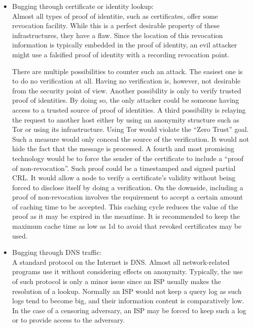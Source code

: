 \begin{itemize}
	\item Bugging through certificate or identity lookup:\\
	Almost all types of proof of identitie, such as certificates, offer some revocation facility. While this is a perfect desirable property of these infrastructures, they have a flaw. Since the location of this revocation information is typically embedded in the proof of identity, an evil attacker might use a falsified proof of identity with a recording revocation point.
	
	There are multiple possibilities to counter such an attack. The easiest one is to do no verification at all. Having no verification is, however, not desirable from the security point of view. Another possibility is only to verify trusted proof of identities. By doing so, the only attacker could be someone having access to a trusted source of proof of identities. A third possibility is relaying the request to another host either by using an anonymity structure such as Tor or using its infrastructure. Using Tor would violate the ``Zero Trust'' goal. Such a measure would only conceal the source of the verification. It would not hide the fact that the message is processed. A fourth and most promising technology would be to force the sender of the certificate to include a ``proof of non-revocation''. Such proof could be a timestamped and signed partial CRL. It would allow a node to verify a certificate's validity without being forced to disclose itself by doing a verification. On the downside, including a proof of non-revocation involves the requirement to accept a certain amount of caching time to be accepted. This caching cycle reduces the value of the proof as it may be expired in the meantime. It is recommended to keep the maximum cache time as low as 1d to avoid that revoked certificates may be used. 
	
	\item Bugging through DNS traffic:\\
	A standard protocol on the Internet is DNS. Almost all network-related programs use it without considering effects on anonymity. %
	 Typically, the use of such protocol is only a minor issue since an ISP usually makes the resolution of a lookup. Normally an ISP would not keep a query log as such logs tend to become big, and their information content is comparatively low. In the case of a censoring adversary, an ISP may be forced to keep such a log or to provide access to the adversary.
	

\end{itemize}
